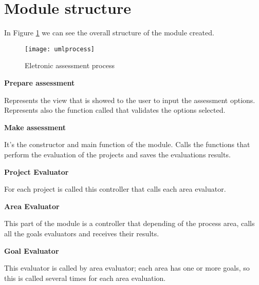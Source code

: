 \section{Module structure}

In Figure \ref{fig:esquema} we can see the overall structure of the module created.

%
%
%
%

\begin{figure}[H]
	\begin{center}
		\leavevmode
		\texttt{[image: umlprocess]}
		\caption{Eletronic assessment process}
		\label{fig:esquema}
	\end{center}
\end{figure}


\newpage

\textbf{Prepare assessment}

Represents the view that is showed to the user to input the assessment options. Represents also the function called that validates the options selected.

\vspace{1cm}

\textbf{Make assessment}

It's the constructor and main function of the module. Calls the functions that perform the evaluation of the projects and saves the evaluations results.

\vspace{1cm}

\textbf{Project Evaluator}

For each project is called this controller that calls each area evaluator.

\vspace{1cm}

\textbf{Area Evaluator}

This part of the module is a controller that depending of the process area, calls all the goals evaluators and receives their results.

\vspace{1cm}

\textbf{Goal Evaluator}

This evaluator is called by area evaluator; each area has one or more goals, so this is called several times for each area evaluation.

